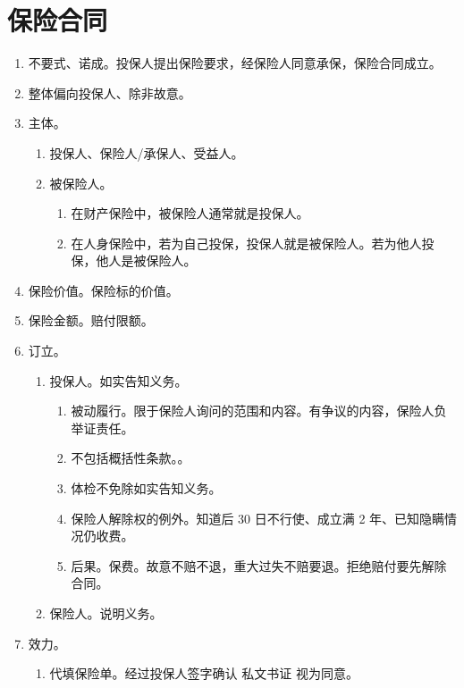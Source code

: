 \section{保险合同}
\begin{enumerate}
  \item 不要式、诺成。投保人提出保险要求，经保险人同意承保，保险合同成立。
  \item 整体偏向投保人、除非故意。
  \item 主体。
        \begin{enumerate}
          \item 投保人、保险人/承保人、受益人。
          \item 被保险人。
                \begin{enumerate}
                  \item 在财产保险中，被保险人通常就是投保人。
                  \item 在人身保险中，若为自己投保，投保人就是被保险人。若为他人投保，他人是被保险人。
                \end{enumerate}
        \end{enumerate}
  \item 保险价值。保险标的价值。
  \item 保险金额。赔付限额。
  \item 订立。
        \begin{enumerate}
          \item 投保人。如实告知义务。
                \begin{enumerate}
                  \item 被动履行。限于保险人询问的范围和内容。有争议的内容，保险人负举证责任。
                  \item 不包括概括性条款。。
                  \item 体检不免除如实告知义务。
                  \item 保险人解除权的例外。知道后 30 日不行使、成立满 2 年、已知隐瞒情况仍收费。
                  \item 后果。\yi 保费。故意不赔不退，重大过失不赔要退。\er 拒绝赔付要先解除合同。
                \end{enumerate}
          \item 保险人。说明义务。
        \end{enumerate}
  \item 效力。
        \begin{enumerate}
          \item 代填保险单。经过投保人签字确认 \yjt 私文书证 \yjt 视为同意。

\end{enumerate}
\end{enumerate}
